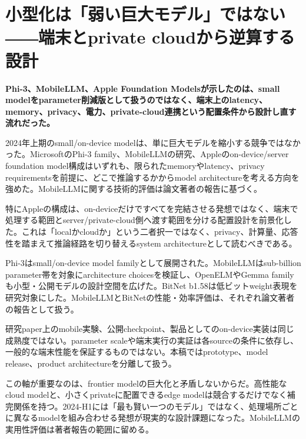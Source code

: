 \section{小型化は「弱い巨大モデル」ではない――端末とprivate cloudから逆算する設計}
\label{pkg:edge-private}
\noindent\textbf{Phi-3、MobileLLM、Apple Foundation Modelsが示したのは、small modelをparameter削減版として扱うのではなく、端末上のlatency、memory、privacy、電力、private-cloud連携という配置条件から設計し直す流れだった。}\autocite{src-86ea660dfc62,src-c89d38f0e830,src-e78721484043}

2024年上期のsmall/on-device modelは、単に巨大モデルを縮小する競争ではなかった。MicrosoftのPhi-3 family、MobileLLMの研究、Appleのon-device/server foundation model構成はいずれも、限られたmemoryやlatency、privacy requirementsを前提に、どこで推論するかからmodel architectureを考える方向を強めた。MobileLLMに関する技術的評価は論文著者の報告に基づく。\autocite{src-86ea660dfc62,src-c89d38f0e830,src-e78721484043}


特にAppleの構成は、on-deviceだけですべてを完結させる発想ではなく、端末で処理する範囲とserver/private-cloud側へ渡す範囲を分ける配置設計を前景化した。これは「localかcloudか」という二者択一ではなく、privacy、計算量、応答性を踏まえて推論経路を切り替えるsystem architectureとして読むべきである。\autocite{src-c89d38f0e830}


Phi-3はsmall/on-device model familyとして展開された。MobileLLMはsub-billion parameter帯を対象にarchitecture choicesを検証し、OpenELMやGemma familyも小型・公開モデルの設計空間を広げた。BitNet b1.58は低ビットweight表現を研究対象にした。MobileLLMとBitNetの性能・効率評価は、それぞれ論文著者の報告として扱う。\autocite{src-0395647db4a8,src-4d404eabda6e,src-86ea660dfc62,src-e78721484043,src-fb3cf48135e8}


\begin{claimboundary}
研究paper上のmobile実験、公開checkpoint、製品としてのon-device実装は同じ成熟度ではない。parameter scaleや端末実行の実証は各sourceの条件に依存し、一般的な端末性能を保証するものではない。本稿ではprototype、model release、product architectureを分離して扱う。\autocite{src-556c0edcf39c,src-86ea660dfc62,src-c89d38f0e830,src-e78721484043}
\end{claimboundary}

この軸が重要なのは、frontier modelの巨大化と矛盾しないからだ。高性能なcloud modelと、小さくprivateに配置できるedge modelは競合するだけでなく補完関係を持つ。2024-H1には「最も賢い一つのモデル」ではなく、処理場所ごとに異なるmodelを組み合わせる発想が現実的な設計課題になった。MobileLLMの実用性評価は著者報告の範囲に留める。\autocite{src-86ea660dfc62,src-c89d38f0e830,src-e78721484043}
